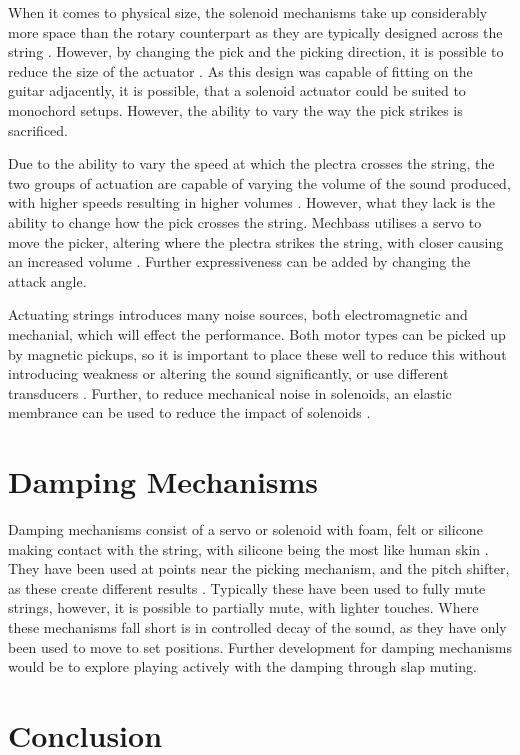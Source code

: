 \documentclass[12pt, a4paper, onecolumn]{IEEEtran}
\begin{document}
        When it comes to physical size, the solenoid mechanisms take up considerably more space than the rotary counterpart as they are typically designed across the string \cite{VUW_Chordophones,Silent_Picking,PWM_Solenoid}.
        However, by changing the pick and the picking direction, it is possible to reduce the size of the actuator \cite{Pivot_Picking}.
        As this design was capable of fitting on the guitar adjacently, it is possible, that a solenoid actuator could be suited to monochord setups.
        However, the ability to vary the way the pick strikes is sacrificed.

        Due to the ability to vary the speed at which the plectra crosses the string, the two groups of actuation are capable of varying the volume of the sound produced, with higher speeds resulting in higher volumes \cite{PWM_Solenoid}.
        However, what they lack is the ability to change how the pick crosses the string.
        Mechbass utilises a servo to move the picker, altering where the plectra strikes the string, with closer causing an increased volume \cite{VUW_Chordophones}. 
        Further expressiveness can be added by changing the attack angle. 

        Actuating strings introduces many noise sources, both electromagnetic and mechanial, which will effect the performance.
        Both motor types can be picked up by magnetic pickups, so it is important to place these well to reduce this without introducing weakness or altering the sound significantly, or use different transducers \cite{VUW_Chordophones}.
        Further, to reduce mechanical noise in solenoids, an elastic membrance can be used to reduce the impact of solenoids \cite{Silent_Picking}.

        
    \section{Damping Mechanisms}
        Damping mechanisms consist of a servo or solenoid with foam, felt or silicone making contact with the string, with silicone being the most like human skin \cite{VUW_Chordophones}.
        They have been used at points near the picking mechanism, and the pitch shifter, as these create different results \cite{VUW_Chordophones}.
        Typically these have been used to fully mute strings, however, it is possible to partially mute, with lighter touches.
        Where these mechanisms fall short is in controlled decay of the sound, as they have only been used to move to set positions.
        Further development for damping mechanisms would be to explore playing actively with the damping through slap muting.


    \section{Conclusion}


    \printbibliography
\end{document}
